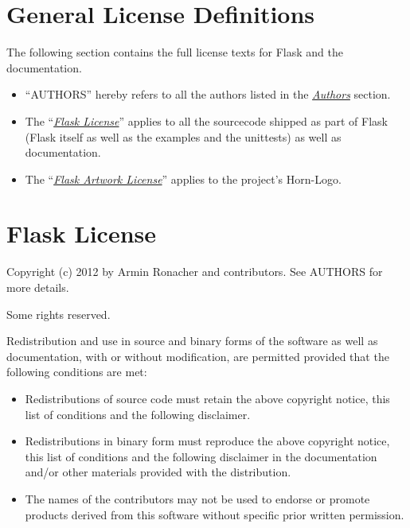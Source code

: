 \documentclass[a4paper,12pt]{sphinxmanual}
\begin{document}
\section{General License Definitions}
\label{license:general-license-definitions}
The following section contains the full license texts for Flask and the
documentation.
\begin{itemize}
\item {} 
``AUTHORS'' hereby refers to all the authors listed in the
{\hyperref[license:authors]{\emph{Authors}}} section.

\item {} 
The ``{\hyperref[license:flask-license]{\emph{Flask License}}}'' applies to all the sourcecode shipped as
part of Flask (Flask itself as well as the examples and the unittests)
as well as documentation.

\item {} 
The ``{\hyperref[license:artwork-license]{\emph{Flask Artwork License}}}'' applies to the project's Horn-Logo.

\end{itemize}


\section{Flask License}
\label{license:id2}\label{license:flask-license}
Copyright (c) 2012 by Armin Ronacher and contributors.  See AUTHORS
for more details.

Some rights reserved.

Redistribution and use in source and binary forms of the software as well
as documentation, with or without modification, are permitted provided
that the following conditions are met:
\begin{itemize}
\item {} 
Redistributions of source code must retain the above copyright
notice, this list of conditions and the following disclaimer.

\item {} 
Redistributions in binary form must reproduce the above
copyright notice, this list of conditions and the following
disclaimer in the documentation and/or other materials provided
with the distribution.

\item {} 
The names of the contributors may not be used to endorse or
promote products derived from this software without specific
prior written permission.

\end{itemize}
\end{document}
